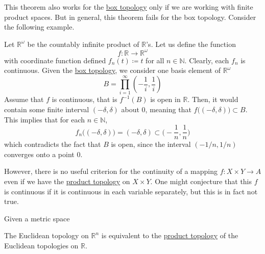   This theorem also works for the \hyperref[def:box-topology]{box topology} only if we are working with finite product spaces. But in general, this theorem fails for the box topology. Consider the following example. 

  \begin{example}
    \label{ex:a-box-discontinuous-map-into-romega}
    Let $\mathbb{R}^\omega$ be the countably infinite product of $\mathbb{R}$'s. Let us define the function 
    \begin{equation}
      f: \mathbb{R} \rightarrow \mathbb{R}^\omega
    \end{equation}
    with coordinate function defined $f_n (t) \coloneqq t$ for all $n \in \mathbb{N}$. Clearly, each $f_n$ is continuous. Given the \hyperref[def:box-topology]{box topology}, we consider one basis element of $\mathbb{R}^\omega$
    \begin{equation}
      B = \prod_{i=1}^\infty (-\frac{1}{i}, \frac{1}{i})
    \end{equation}
    Assume that $f$ is continuous, that is $f^{-1}(B)$ is open in $\mathbb{R}$. Then, it would contain some finite interval $(-\delta, \delta)$ about $0$, meaning that $f\big( (-\delta, \delta)\big) \subset B$. This implies that for each $n \in \mathbb{N}$, 
    \begin{equation}
      f_n \big( (-\delta, \delta) \big) = (-\delta, \delta) \subset \Big( -\frac{1}{n}, \frac{1}{n} \Big)
    \end{equation}
    which contradicts the fact that $B$ is open, since the interval $(-1/n, 1/n)$ converges onto a point $0$. 
  \end{example}

  However, there is no useful criterion for the continuity of a mapping $f: X \times Y \to A$ even if we have the \hyperref[def:product-topology]{product topology} on $X \times Y$. One might conjecture that this $f$ is continuous if it is continuous in each variable separately, but this is in fact not true. 

  \begin{theorem}
    \label{thm:topologies-on-products-of-metric-spaces-coincide}
    Given a metric space
  \end{theorem}

  \begin{corollary}
    \label{thm:euclidean-and-product-topologies-agree-on-rn}
    The Euclidean topology on $\mathbb{R}^n$ is equivalent to the \hyperref[def:product-topology]{product topology} of the Euclidean topologies on $\mathbb{R}$. 
  \end{corollary} 


